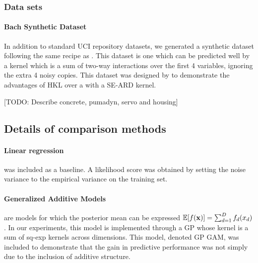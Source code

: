 \documentclass[twoside]{article}
\begin{document}
\subsubsection{Data sets}


\paragraph{Bach Synthetic Dataset}
In addition to standard UCI repository datasets, we generated a synthetic dataset following the same recipe as \cite{DBLP:journals/corr/abs-0909-0844}.
This dataset is one which can be predicted well by a kernel which is a sum of two-way interactions over the first 4 variables, ignoring the extra 4 noisy copies.
%
This dataset was designed by \cite{DBLP:journals/corr/abs-0909-0844} to demonstrate the advantages of HKL over a \gp{} with a SE-ARD kernel. 


[TODO: Describe concrete, pumadyn, servo and housing]

\subsection{Details of comparison methods}

\paragraph{Linear regression} was included as a baseline. A likelihood score was obtained by setting the noise variance to the empirical variance on the training set.

\paragraph{Generalized Additive Models} are models for which the posterior mean can be expressed $\mathbb{E}[f({\bf{x}})] = \sum_{d=1}^D f_d(x_d)$.  
In our experiments, this model is implemented through a GP whose kernel is a sum of sq-exp kernels across dimensions.  
This model, denoted GP GAM, was included to demonstrate that the gain in predictive performance was not simply due to the inclusion of additive structure.
\end{document}

